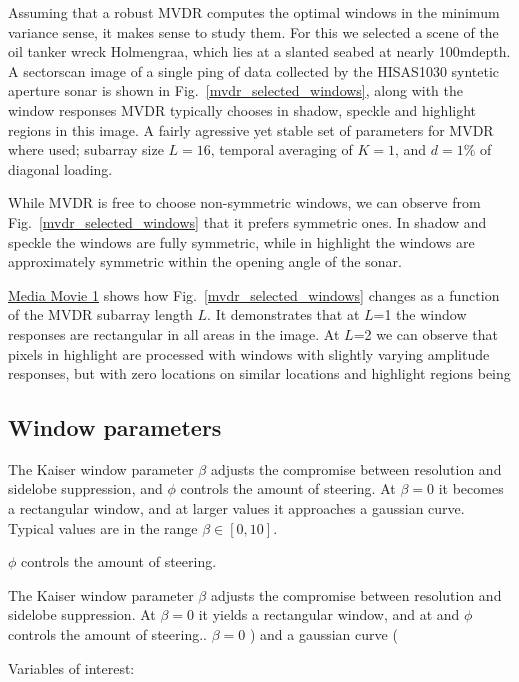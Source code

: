 \documentclass[10pt,journal,draftclsnofoot,onecolumn]{IEEEtran}
\newcommand\Fig[1]{Fig.~\ref{#1}}
\newcommand\1{\vec 1}
\newcommand\multimedia[2]{\href{#1}{#2}}
\newcommand\mediaPath{gfx/media}
\newcommand\mediaI{\multimedia{\mediaPath/media1.mp4}{Media Movie 1}}
\begin{document}
Assuming that a robust MVDR computes the optimal windows in the minimum variance sense, it makes sense to study them. For this we selected a scene of the oil tanker wreck Holmengraa, which lies at a slanted seabed at nearly 100m\;depth. A sectorscan image of a single ping of data collected by the HISAS1030 syntetic aperture sonar is shown in \Fig{mvdr_selected_windows}, along with the window responses MVDR typically chooses in shadow, speckle and highlight regions in this image. A fairly agressive yet stable set of parameters for MVDR where used; subarray size $L=16$, temporal averaging of $K=1$, and $d=1\%$ of diagonal loading.

While MVDR is free to choose non-symmetric windows, we can observe from \Fig{mvdr_selected_windows} that it prefers symmetric ones. In shadow and speckle the windows are fully symmetric, while in highlight the windows are approximately symmetric within the opening angle of the sonar.

\mediaI{} shows how \Fig{mvdr_selected_windows} changes as a function of the MVDR subarray length $L$. It demonstrates that at $L$=1 the window responses are rectangular in all areas in the image. At $L$=2 we can observe that pixels in highlight are processed with windows with slightly varying amplitude responses, but with zero locations on similar locations and highlight regions being 


\subsection{Window parameters}

The Kaiser window parameter $\beta$ adjusts the compromise between resolution and sidelobe suppression, and $\phi$ controls the amount of steering. At $\beta=0$ it becomes a rectangular window, and at larger values it approaches a gaussian curve. Typical values are in the range $\beta\in[0,10]$.

$\phi$ controls the amount of steering. 

The Kaiser window parameter $\beta$ adjusts the compromise between resolution and sidelobe suppression. At $\beta=0$ it yields a rectangular window, and at and $\phi$ controls the amount of steering.. $\beta=0$ ) and a gaussian curve (





Variables of interest:
\end{document}
